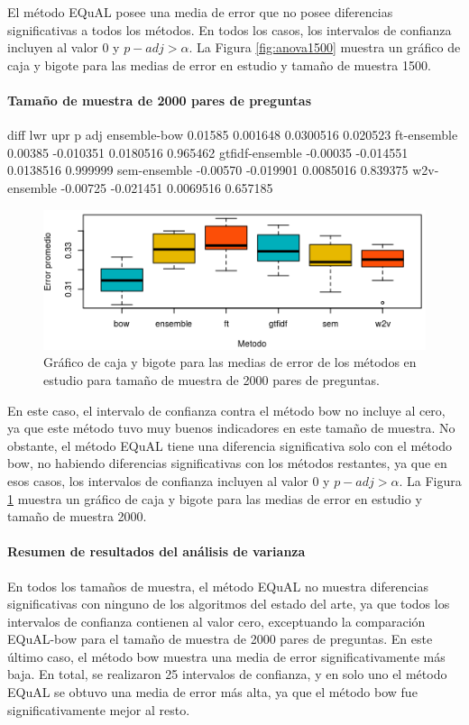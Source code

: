 \bigskip El método EQuAL posee una media de error que no posee diferencias significativas a todos los métodos. En todos los casos, los intervalos de confianza incluyen al valor 0 y \(p{-}adj > \alpha\). La Figura \ref{fig:anova1500} muestra un gráfico de caja y bigote para las medias de error en estudio y tamaño de muestra 1500.

\bigskip
\paragraph{Tamaño de muestra de 2000 pares de preguntas}
\begin{rc}
                  diff       lwr       upr      p adj
ensemble-bow     0.01585  0.001648 0.0300516 0.020523
ft-ensemble      0.00385 -0.010351 0.0180516 0.965462
gtfidf-ensemble -0.00035 -0.014551 0.0138516 0.999999
sem-ensemble    -0.00570 -0.019901 0.0085016 0.839375
w2v-ensemble    -0.00725 -0.021451 0.0069516 0.657185
\end{rc}

\begin{figure}
	\centering
	\includegraphics[width=0.7\linewidth]{10_resultados/imagenes/anova_2000}
	\caption{Gráfico de caja y bigote para las medias de error de los métodos en estudio para tamaño de muestra de 2000 pares de preguntas.}
	\label{fig:anova2000}
\end{figure}

\bigskip En este caso, el intervalo de confianza contra el método bow no incluye al cero, ya que este método tuvo muy buenos indicadores en este tamaño de muestra. No obstante, el método EQuAL tiene una diferencia significativa solo con el método bow, no habiendo diferencias significativas con los métodos restantes, ya que en esos casos, los intervalos de confianza incluyen al valor \(0\) y \(p{-}adj > \alpha\). La Figura \ref{fig:anova2000} muestra un gráfico de caja y bigote para las medias de error en estudio y tamaño de muestra 2000.

\bigskip
\paragraph{Resumen de resultados del análisis de varianza}
En todos los tamaños de muestra, el método EQuAL no muestra diferencias significativas con ninguno de los algoritmos del estado del arte, ya que todos los intervalos de confianza contienen al valor cero, exceptuando la comparación EQuAL-bow para el tamaño de muestra de 2000 pares de preguntas. En este último caso, el método bow muestra una media de error significativamente más baja. En total, se realizaron 25 intervalos de confianza, y en solo uno el método EQuAL se obtuvo una media de error más alta, ya que el método bow fue significativamente mejor al resto.

